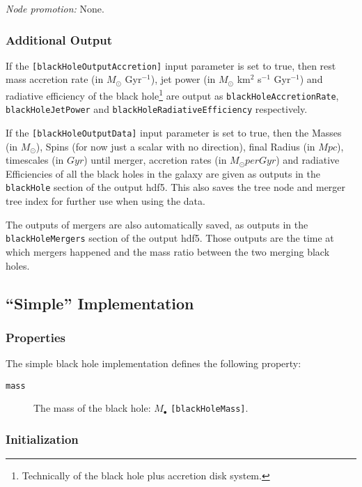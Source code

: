 \noindent\emph{Node promotion:} None.\\

\subsubsection{Additional Output}

If the {\tt [blackHoleOutputAccretion]} input parameter is set to true, then rest mass accretion rate (in $M_\odot$ Gyr$^{-1}$), jet power (in $M_\odot$ km$^2$ s$^{-1}$ Gyr$^{-1}$) and radiative efficiency of the black hole\footnote{Technically of the black hole plus accretion disk system.} are output as {\tt blackHoleAccretionRate}, {\tt blackHoleJetPower} and {\tt blackHoleRadiativeEfficiency} respectively.

If the {\tt [blackHoleOutputData]} input parameter is set to true, then the Masses (in $M_\odot$), Spins (for now just a scalar with no direction), final Radius (in $Mpc$), timescales (in $Gyr$) until merger, accretion rates (in $M_\odot per Gyr$) and radiative Efficiencies of all the black holes in the galaxy are given as outputs in the {\tt blackHole} section of the output hdf5. This also saves the tree \gls{node} and merger tree index for further use when using the data.

The outputs of mergers are also automatically saved, as outputs in the {\tt blackHoleMergers} section of the output hdf5. Those outputs are the time at which mergers happened and the mass ratio between  the two merging black holes.


\subsection{``Simple'' Implementation}

\subsubsection{Properties}

The simple black hole implementation defines the following property:
\begin{description}
 \item [{\tt mass}] The mass of the black hole: $M_\bullet$ {\tt [blackHoleMass]}.
\end{description}

\subsubsection{Initialization}


